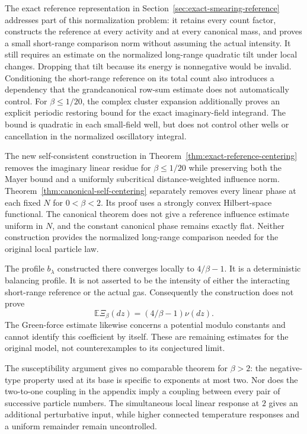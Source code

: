 \documentclass[11pt]{article}
\theoremstyle{remark}\newtheorem{remark}[theorem]{Remark}
\begin{document}
The exact reference representation in
Section~\ref{sec:exact-smearing-reference} addresses part of this
normalization problem: it retains every count factor, constructs
the reference at every activity and at every canonical mass, and
proves a small short-range comparison norm without assuming the
actual intensity. It still requires an estimate on the normalized
long-range quadratic tilt under local changes. Dropping that tilt
because its energy is nonnegative would be invalid. Conditioning
the short-range reference on its total count also introduces a
dependency that the grandcanonical row-sum estimate does not
automatically control. For $\beta\le1/20$, the complex cluster
expansion additionally proves an explicit periodic restoring bound
for the exact imaginary-field integrand. The bound is quadratic
in each small-field well, but does not control other wells or
cancellation in the normalized oscillatory integral.

The new self-consistent construction in
Theorem~\ref{thm:exact-reference-centering} removes the imaginary
linear residue for $\beta\le1/20$ while preserving both the Mayer
bound and a uniformly subcritical distance-weighted influence norm.
Theorem~\ref{thm:canonical-self-centering} separately removes every
linear phase at each fixed $N$ for $0<\beta<2$. Its proof uses a
strongly convex Hilbert-space functional. The canonical theorem
does not give a reference influence estimate uniform in $N$, and
the constant canonical phase remains exactly flat. Neither
construction provides the normalized long-range comparison needed
for the original local particle law.

The profile $b_\lambda$ constructed there converges locally to
$4/\beta-1$. It is a deterministic balancing profile. It is not
asserted to be the intensity of either the interacting short-range
reference or the actual gas. Consequently the construction does
not prove
\[
 \mathbb E\Xi_\beta(dz)=(4/\beta-1)\nu(dz).
\]
The Green-force estimate likewise concerns a potential modulo
constants and cannot identify this coefficient by itself. These
are remaining estimates for the original model, not counterexamples
to its conjectured limit.

The susceptibility argument gives no comparable theorem for
$\beta>2$: the negative-type property used at its base is specific
to exponents at most two. Nor does the two-to-one coupling in the
appendix imply a coupling between every pair of successive particle
numbers. The simultaneous local linear response at $2$ gives an
additional perturbative input, while higher connected temperature
responses and a uniform remainder remain uncontrolled.
\end{document}

